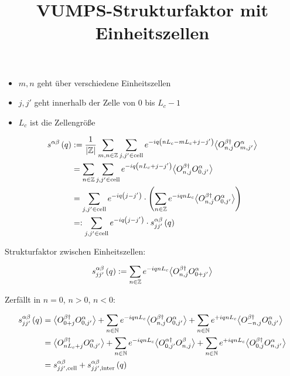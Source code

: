 \documentclass[12pt,paper=a4,BCOR=16mm]{article}
\title{VUMPS-Strukturfaktor mit Einheitszellen}
\begin{document}
\maketitle

\begin{itemize}
\item $m,n$ geht \"uber verschiedene Einheitszellen
\item $j,j'$ geht innerhalb der Zelle von $0$ bis $L_c-1$
\item $L_c$ ist die Zellengr\"o{\ss}e
\end{itemize}

\begin{equation}
\begin{split}
s^{\alpha\beta}\left(q\right) &:= \frac{1}{\left|\mathbb{Z}\right|} \sum_{m,n\in\mathbb{Z}} \sum_{j,j'\in\text{cell}} e^{-iq\left(nL_c-mL_c+j-j'\right)} \big< O^{\beta\dagger}_{n,j} O^{\alpha}_{m,j'} \big>\\
                      &= \sum_{n\in\mathbb{Z}} \sum_{j,j'\in\text{cell}} e^{-iq\left(nL_c+j-j'\right)} \big< O^{\beta\dagger}_{n,j} O^{\alpha}_{0,j'} \big>\\
                      &= \sum_{j,j'\in\text{cell}} e^{-iq\left(j-j'\right)} \cdot \left( \sum_{n\in\mathbb{Z}} e^{-iqnL_c} \big< O^{\beta\dagger}_{n,j} O^{\alpha}_{0,j'} \big> \right)\\
                      &=: \sum_{j,j'\in\text{cell}} e^{-iq\left(j-j'\right)} \cdot s^{\alpha\beta}_{jj'}\left(q\right)
\end{split}
\end{equation}

Strukturfaktor zwischen Einheitszellen:

\begin{equation}
s^{\alpha\beta}_{jj'}\left(q\right) := \sum_{n\in\mathbb{Z}} e^{-iqnL_c} \big< O^{\beta\dagger}_{n,j} O^{\alpha}_{0+j'} \big>
\end{equation}

Zerf\"allt in $n=0$, $n>0$, $n<0$:

\begin{equation}
\begin{split}
s^{\alpha\beta}_{jj'}\left(q\right) &= \big< O^{\beta\dagger}_{0+j} O^{\alpha}_{0,j'} \big> + 
                               \sum_{n\in\mathbb{N}} e^{-iqnL_c} \big< O^{\beta\dagger}_{n,j} O^{\alpha}_{0,j'} \big> + 
                               \sum_{n\in\mathbb{N}} e^{+iqnL_c} \big< O^{\beta\dagger}_{-n,j} O^{\alpha}_{0,j'} \big> \\
                            &= \big< O^{\beta\dagger}_{nL_c+j} O^{\alpha}_{0,j'} \big> + 
                               \sum_{n\in\mathbb{N}} e^{-iqnL_c} \big< O^{\alpha\dagger}_{0,j'} O^{\beta}_{n,j} \big> + 
                               \sum_{n\in\mathbb{N}} e^{+iqnL_c} \big< O^{\beta\dagger}_{0,j} O^{\alpha}_{n,j'} \big>\\
                            &= s^{\alpha\beta}_{jj',\text{cell}} + s^{\alpha\beta}_{jj',\text{inter}}\left(q\right)
\end{split}
\end{equation}
\end{document}
